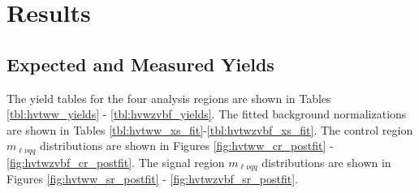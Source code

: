 \chapter{Results}
\section{Expected and Measured Yields}
The yield tables for the four analysis regions are shown in Tables \ref{tbl:hvtww_yields} - \ref{tbl:hvwzvbf_yields}. The fitted background normalizations are shown in Tables \ref{tbl:hvtww_xs_fit}-\ref{tbl:hvtwzvbf_xs_fit}. The control region $m_{\ell\nu qq}$ distributions are shown in Figures \ref{fig:hvtww_cr_postfit} - \ref{fig:hvtwzvbf_cr_postfit}. The signal region $m_{\ell\nu qq}$ distributions are shown in Figures \ref{fig:hvtww_sr_postfit} - \ref{fig:hvtwzvbf_sr_postfit}.
